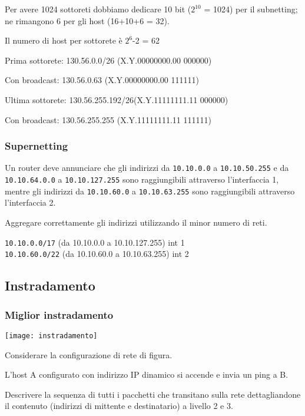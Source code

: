             \solution
            Per avere 1024 sottoreti dobbiamo dedicare 10 bit ($2^{10}$ = 1024) per il subnetting; ne rimangono 6 per gli host (16+10+6 = 32).

            Il numero di host per sottorete è $2^6$-2 = 62
            
            Prima sottorete: 130.56.0.0/26 (X.Y.00000000.00 000000)
            
            Con broadcast: 130.56.0.63 (X.Y.00000000.00 111111)
            
            Ultima sottorete: 130.56.255.192/26(X.Y.11111111.11 000000)
        
            Con broadcast: 130.56.255.255 (X.Y.11111111.11 111111)
        
        \subsubsection{Supernetting}
            \problem
            Un router deve annunciare che gli indirizzi da \verb|10.10.0.0| a \verb|10.10.50.255| e da \verb|10.10.64.0.0| a \verb|10.10.127.255| sono raggiungibili attraverso l'interfaccia 1, mentre gli indirizzi da \verb|10.10.60.0| a \verb|10.10.63.255| sono raggiungibili attraverso l'interfaccia 2.

            Aggregare correttamente gli indirizzi utilizzando il minor numero di reti.

            \solution
            \verb|10.10.0.0/17| (da 10.10.0.0 a 10.10.127.255) int 1\\
            \verb|10.10.60.0/22| (da 10.10.60.0 a 10.10.63.255) int 2
    
    \subsection{Instradamento}
        \subsubsection{Miglior instradamento}
            \problem
            \centerline{\texttt{[image: instradamento]}}

            Considerare la configurazione di rete di figura.

            L'host A configurato con indirizzo IP dinamico si accende e invia un ping a B.

            Descrivere la sequenza di tutti i pacchetti che transitano sulla rete dettagliandone il contenuto (indirizzi di mittente e destinatario) a livello 2 e 3.

